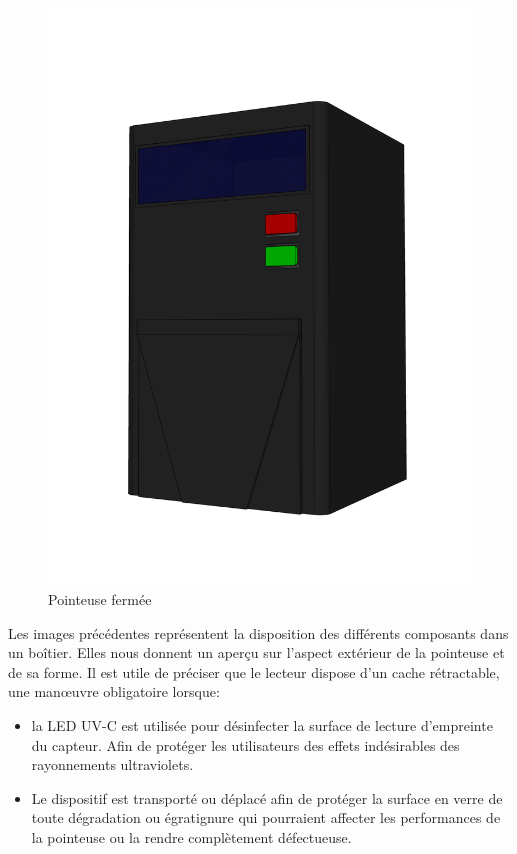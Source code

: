 \begin{figure}[!htb]
\begin{minipage}{0.5\textwidth}
        \includegraphics[scale=0.16]{images/prototype/4.png}
        \vspace{-40pt}
        \caption{Pointeuse fermée}\label{ }
    \end{minipage}
\end{figure}
\clearpage

Les images précédentes représentent la disposition des différents composants 
dans un boîtier. Elles nous donnent un aperçu sur l’aspect extérieur de la 
pointeuse et de sa forme. Il est utile de préciser que le lecteur dispose d’un 
cache rétractable, une manœuvre obligatoire lorsque:

\begin{itemize}
    \item [\textbullet] la LED UV-C est utilisée pour désinfecter la surface de
        lecture d’empreinte du capteur. Afin de protéger les utilisateurs des
        effets indésirables des rayonnements ultraviolets.
    \item [\textbullet]  Le dispositif est transporté ou déplacé afin de
        protéger la surface en verre de toute dégradation ou égratignure qui
        pourraient affecter les performances de la pointeuse ou la rendre
        complètement défectueuse.  
\end{itemize}


